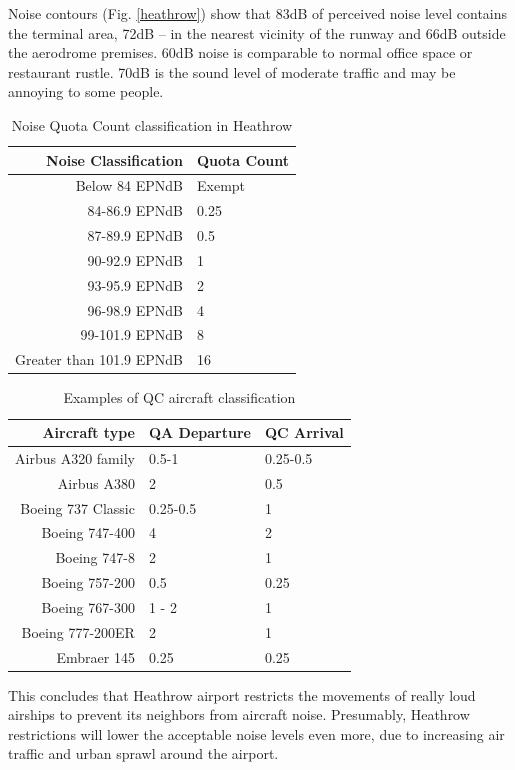 Noise contours (Fig. \ref{heathrow}) show that 83dB of perceived noise level contains the terminal area, 72dB -- in the nearest vicinity of the runway and 66dB outside the aerodrome premises. 60dB noise is comparable to normal office space or restaurant rustle. 70dB is the sound level of moderate traffic and may be annoying to some people.

\begin{table}[]
\centering
\caption{Noise Quota Count classification in Heathrow \citep{ERCD}}
\label{tab:qc1}
\begin{tabular}{@{}rl@{}}
\toprule
Noise Classification & Quota Count \\ \midrule
Below 84 EPNdB & Exempt \\
84-86.9 EPNdB & 0.25 \\
87-89.9 EPNdB & 0.5 \\
90-92.9 EPNdB & 1 \\
93-95.9 EPNdB & 2 \\
96-98.9 EPNdB & 4 \\
99-101.9 EPNdB & 8 \\
Greater than 101.9 EPNdB & 16 \\ \bottomrule
\end{tabular}
\end{table}

\begin{table}[]
\centering
\caption{Examples of QC aircraft classification \citep{ERCD}}
\label{tab:qc2}
\begin{tabular}{@{}rll@{}}
\toprule
Aircraft type & QA Departure & QC Arrival \\ \midrule
Airbus A320 family & 0.5-1 & 0.25-0.5 \\
Airbus A380 & 2 & 0.5 \\
Boeing 737 Classic & 0.25-0.5 & 1 \\
Boeing 747-400 & 4 & 2 \\
Boeing 747-8 & 2 & 1 \\
Boeing 757-200 & 0.5 & 0.25 \\
Boeing 767-300 & 1 - 2 & 1 \\
Boeing 777-200ER & 2 & 1 \\
Embraer 145 & 0.25 & 0.25 \\ \bottomrule
\end{tabular}
\end{table}

This concludes that Heathrow airport restricts the movements of really loud airships to prevent its neighbors from aircraft noise. Presumably, Heathrow restrictions will lower the acceptable noise levels even more, due to increasing air traffic and urban sprawl around the airport.

